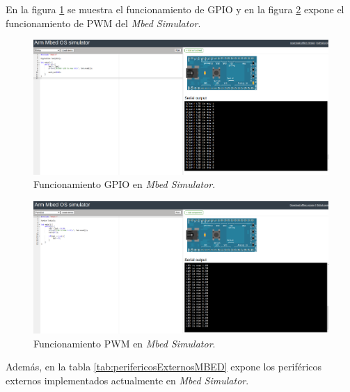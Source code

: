 En la figura \ref{fig:GPIOMbed} se muestra el funcionamiento de GPIO y en la figura \ref{fig:PMWMbed} expone el funcionamiento de PWM del \textit{Mbed Simulator}.

\hfill \break
\hfill \break
\hfill \break
\hfill \break
\hfill \break

\begin{figure}[ht]
	\centering
	\includegraphics[scale=.24]{./Figures/GPIOMbed.png}
	\caption{Funcionamiento GPIO en \textit{Mbed Simulator}.}
	\label{fig:GPIOMbed}
\end{figure}

\begin{figure}[ht]
	\centering
	\includegraphics[scale=.24]{./Figures/PMWMbed.png}
	\caption{Funcionamiento PWM en \textit{Mbed Simulator}.}
	\label{fig:PMWMbed}
\end{figure}





Además, en la tabla \ref{tab:perifericosExternosMBED} expone los  periféricos externos implementados actualmente en \textit{Mbed Simulator}.


